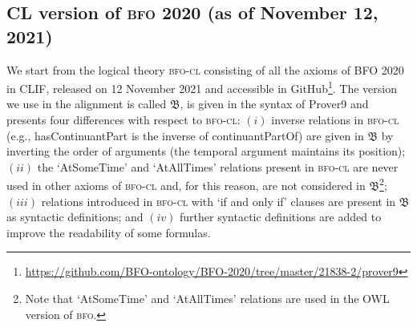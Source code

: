 \documentclass[ao]{iosart2x}
\newcommand{\nb}[1]{\textcolor{red}{$|$}\marginpar{\hspace*{-0cm}\parbox{20mm}{\scriptsize\raggedright\textcolor{red}{#1}}}}
\newcommand{\bfoDefLabel}{\textrm{d$_\texttt{b}$}}
\newcommand{\refbfodf}[1]{({\bfoDefLabel}\ref{#1})}
\newcommand{\dolce}{{\textsc{dolce}}}
\newcommand{\bfo}{{\textsc{bfo}}}
\newcommand{\bfocl}{{\textsc{bfo-cl}}}
\newcommand {\thbfo} {\ensuremath{\mathfrak{B}}}
\begin{document}
\subsection{CL version of {\bfo} 2020 (as of November 12, 2021)}\label{sect_bfo}

%

We start from the logical theory {\bfocl} consisting of all the axioms of BFO 2020 in CLIF, released on 12 November 2021 and accessible in GitHub\footnote{\url{https://github.com/BFO-ontology/BFO-2020/tree/master/21838-2/prover9}}. The version we use in the alignment is called $\thbfo$, is given in the syntax of Prover9  and presents four differences with respect to {\bfocl}: $(i)$ inverse relations in {\bfocl} (e.g., hasContinuantPart is the inverse of continuantPartOf) are given in $\thbfo$ by inverting the order of arguments (the temporal argument maintains its position);  $(ii)$ the `AtSomeTime' and `AtAllTimes' relations present in {\bfocl} are never used in other axioms of {\bfocl} and, for this reason, are not considered in $\thbfo$\footnote{Note that `AtSomeTime' and `AtAllTimes' relations are used in the OWL version of {\bfo}.}; $(iii)$ relations introduced in {\bfocl} with `if and only if' clauses are present in $\thbfo$ as syntactic definitions;
and $(iv)$ further syntactic definitions are added to improve the readability of some formulas.
\end{document}

